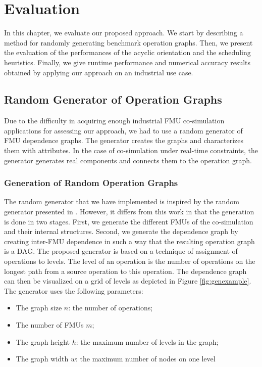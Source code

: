 \chapter{\label{ch:6-eval}Evaluation}

\minitoc

In this chapter, we evaluate our proposed approach. We start by describing a method for randomly generating benchmark operation graphs. Then, we present the evaluation of the performances of the acyclic orientation and the scheduling heuristics. Finally, we give runtime performance and numerical accuracy results obtained by applying our approach on an industrial use case.

\section{Random Generator of Operation Graphs}

Due to the difficulty in acquiring enough industrial FMU co-simulation applications for assessing our approach, we had to use a random generator of FMU dependence graphs. The generator creates the graphs and characterizes them with attributes. In the case of co-simulation under real-time constraints, the generator generates real components and connects them to the operation graph.

\subsection{Generation of Random Operation Graphs}

The random generator that we have implemented is inspired by the random generator presented in \cite{kalla:2004}. However, it differs from this work in that the generation is done in two stages. First, we generate the different FMUs of the co-simulation and their internal structures. Second, we generate the dependence graph by creating inter-FMU dependence in such a way that the resulting operation graph is a DAG. The proposed generator is based on a technique of assignment of operations to levels. The level of an operation is the number of operations on the longest path from a source operation to this operation. The dependence graph can then be visualized on a grid of levels as depicted in Figure \ref{fig:genexample}. The generator uses the following parameters:

\begin{itemize}
\item The graph size $n$: the number of operations;
\item The number of FMUs $m$;
\item The graph height $h$: the maximum number of levels in the graph;
\item The graph width $w$: the maximum number of nodes on one level
\end{itemize}

